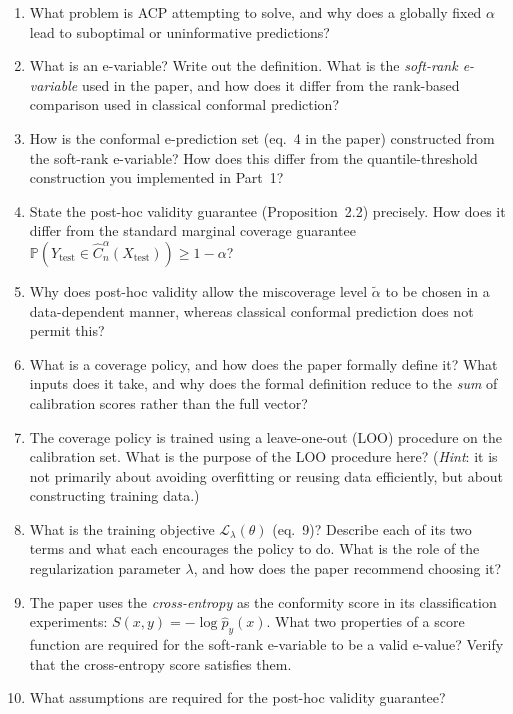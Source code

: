 \documentclass[11pt]{article}
\begin{document}
\begin{enumerate}[label=\arabic*.]

\item What problem is ACP attempting to solve, and why does a globally fixed
$\alpha$ lead to suboptimal or uninformative predictions?

\item What is an e-variable? Write out the definition. What is the
\emph{soft-rank e-variable} used in the paper, and how does it differ from
the rank-based comparison used in classical conformal prediction?

\item How is the conformal e-prediction set (eq.~4 in the paper) constructed
from the soft-rank e-variable? How does this differ from the
quantile-threshold construction you implemented in Part~1?

\item State the post-hoc validity guarantee (Proposition~2.2) precisely.
How does it differ from the standard marginal coverage guarantee
$\mathbb{P}(Y_{\mathrm{test}} \in \hat C_n^\alpha(X_{\mathrm{test}})) \ge
1-\alpha$?

\item Why does post-hoc validity allow the miscoverage level $\tilde\alpha$
to be chosen in a data-dependent manner, whereas classical conformal
prediction does not permit this?

\item What is a coverage policy, and how does the paper formally define it?
What inputs does it take, and why does the formal definition reduce to the
\emph{sum} of calibration scores rather than the full vector?

\item The coverage policy is trained using a leave-one-out (LOO) procedure
on the calibration set. What is the purpose of the LOO procedure here?
(\emph{Hint}: it is not primarily about avoiding overfitting or reusing data
efficiently, but about constructing training data.)

\item What is the training objective $\mathcal{L}_\lambda(\theta)$ (eq.~9)?
Describe each of its two terms and what each encourages the policy to do.
What is the role of the regularization parameter $\lambda$, and how does the
paper recommend choosing it?

\item The paper uses the \emph{cross-entropy} as the conformity score in its
classification experiments:
$S(x, y) = -\log \hat p_y(x)$.
What two properties of a score function are required for the soft-rank
e-variable to be a valid e-value? Verify that the cross-entropy score
satisfies them.

\item What assumptions are required for the post-hoc validity guarantee?

\end{enumerate}
\end{document}
